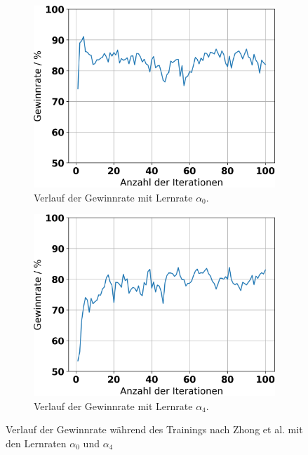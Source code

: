 
\begin{figure}[ht!]%
	\begin{subfigure}[b]{0.48\textwidth}
		\includegraphics[width=\textwidth]{Bilder/ensemble-training/a_0_001/graph_win_rates.png}
		\caption{Verlauf der Gewinnrate mit Lernrate $\alpha_0$.}
		\label{fig:f9}
	\end{subfigure}
	\hfill
	\begin{subfigure}[b]{0.48\textwidth}
		\includegraphics[width=\textwidth]{Bilder/ensemble-training/e_0_00001/graph_win_rates.png}
		\caption{Verlauf der Gewinnrate mit Lernrate $\alpha_4$.}
		\label{fig:f10}
	\end{subfigure}
	\caption{Verlauf der Gewinnrate während des Trainings nach Zhong et al. mit den Lernraten $\alpha_0$ und $\alpha_4$}
\end{figure}

